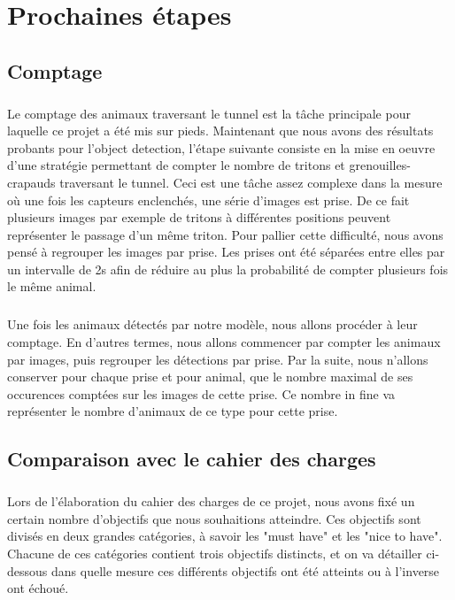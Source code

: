 \chapter{Prochaines étapes}\label{chap:next_steps}
\section{Comptage}\label{anal:comptage}
\paragraph{} Le comptage des animaux traversant le tunnel est la tâche principale pour laquelle ce projet a été mis sur pieds. Maintenant que nous avons des résultats probants pour l'object detection, l'étape suivante consiste en la mise en oeuvre d'une stratégie permettant de compter le nombre de tritons et grenouilles-crapauds traversant le tunnel. Ceci est une tâche assez complexe dans la mesure où une fois les capteurs enclenchés, une série d'images est prise. De ce fait plusieurs images par exemple de tritons à différentes positions peuvent représenter le passage d'un même triton. Pour pallier cette difficulté, nous avons pensé à regrouper les images par prise. Les prises ont été séparées entre elles par un intervalle de 2s afin de réduire au plus la probabilité de compter plusieurs fois le même animal. 

\paragraph{} Une fois les animaux détectés par notre modèle, nous allons procéder à leur comptage. En d'autres termes, nous allons commencer par compter les animaux par images, puis regrouper les détections par prise. Par la suite, nous n'allons conserver pour chaque prise et pour animal, que le nombre maximal de ses occurences comptées sur les images de cette prise. Ce nombre in fine va représenter le nombre d'animaux de ce type pour cette prise. 

\section{Comparaison avec le cahier des charges}

\paragraph{} Lors de l'élaboration du cahier des charges de ce projet, nous avons fixé un certain nombre d'objectifs que nous souhaitions atteindre. Ces objectifs sont divisés en deux grandes catégories, à savoir les "must have" et les "nice to have". Chacune de ces catégories contient trois objectifs distincts, et on va détailler ci-dessous dans quelle mesure ces différents objectifs ont été atteints ou à l'inverse ont échoué.

